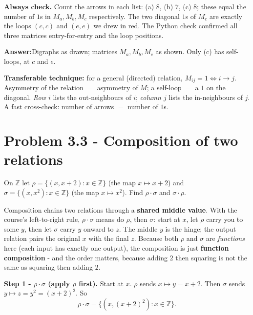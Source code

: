 \documentclass[11pt,a4paper]{article}
\newcommand{\Z}{\mathbb{Z}}
\newcommand{\answer}[1]{\begin{answerbox}\centering\textbf{Answer:}\quad #1\end{answerbox}}
\begin{document}
\textbf{Always check.} Count the arrows in each list: (a) $8$, (b) $7$, (c) $8$; these equal the
number of $1$s in $M_a,M_b,M_c$ respectively. The two diagonal $1$s of $M_c$ are exactly the loops
$(c,c)$ and $(e,e)$ we drew in red. The Python check confirmed all three matrices entry-for-entry
and the loop positions. \checkmark

\answer{Digraphs as drawn; matrices $M_a,M_b,M_c$ as shown. Only (c) has self-loops, at $c$ and $e$.}

\begin{methodbox}
\textbf{Transferable technique:} for a general (directed) relation, $M_{ij}=1\iff i\to j$. Asymmetry
of the relation $=$ asymmetry of $M$; a self-loop $=$ a $1$ on the diagonal. \emph{Row $i$} lists the
out-neighbours of $i$; \emph{column $j$} lists the in-neighbours of $j$. A fast cross-check: number of
arrows $=$ number of $1$s.
\end{methodbox}

\section*{Problem 3.3 - Composition of two relations}

\begin{problembox}[3.3]
On $\Z$ let $\rho=\{(x,x+2):x\in\Z\}$ (the map $x\mapsto x+2$) and
$\sigma=\{(x,x^2):x\in\Z\}$ (the map $x\mapsto x^2$). Find $\rho\cdot\sigma$ and $\sigma\cdot\rho$.
\end{problembox}

\begin{ideabox}
Composition chains two relations through a \textbf{shared middle value}. With the course's
left-to-right rule, $\rho\cdot\sigma$ means \textquotedbl{}do $\rho$, then $\sigma$\textquotedbl{}:
start at $x$, let $\rho$ carry you to some $y$, then let $\sigma$ carry $y$ onward to $z$. The middle
$y$ is the hinge; the output relation pairs the original $x$ with the final $z$. Because both $\rho$
and $\sigma$ are \emph{functions} here (each input has exactly one output), the composition is just
\textbf{function composition} - and the order matters, because adding $2$ then squaring is not the
same as squaring then adding $2$.
\end{ideabox}

\textbf{Step 1 - $\rho\cdot\sigma$ (apply $\rho$ first).}
Start at $x$. $\rho$ sends $x\mapsto y=x+2$. Then $\sigma$ sends $y\mapsto z=y^2=(x+2)^2$. So
\[\rho\cdot\sigma=\{(x,(x+2)^2):x\in\Z\}.\]
\end{document}
